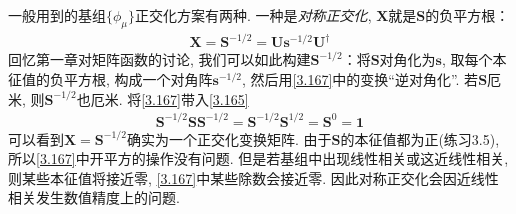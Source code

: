 一般用到的基组$\{\phi_\mu\}$正交化方案有两种. 一种是\emph{对称正交化}, $\mathbf{X}$就是$\mathbf{S}$的负平方根：
\begin{align}\label{3.167}
	\mathbf{X} = \mathbf{S}^{-1/2} = \mathbf{U}\mathbf{s}^{-1/2}\mathbf{U}^\dagger
\end{align}
回忆第一章对矩阵函数的讨论, 
我们可以如此构建$\mathbf{S}^{-1/2}$：将$\mathbf{S}$对角化为$\mathbf{s}$, 
取每个本征值的负平方根, 
构成一个对角阵$\mathbf{s}^{-1/2}$, 
然后用\autoref{3.167}中的变换``逆对角化”. 
若$\mathbf{S}$厄米, 
则$\mathbf{S}^{-1/2}$也厄米. 
将\autoref{3.167}带入\autoref{3.165}
\begin{align}
	\mathbf{S}^{-1/2}\mathbf{SS}^{-1/2} = \mathbf{S}^{-1/2}\mathbf{S}^{1/2} = \mathbf{S}^0 = \mathbf{1}
\end{align} 
可以看到$\mathbf{X=S}^{-1/2}$确实为一个正交化变换矩阵. 
由于$\mathbf{S}$的本征值都为正(练习3.5), 
所以\autoref{3.167}中开平方的操作没有问题. 
但是若基组中出现线性相关或这近线性相关, 
则某些本征值将接近零, 
\autoref{3.167}中某些除数会接近零. 
因此对称正交化会因近线性相关发生数值精度上的问题.


